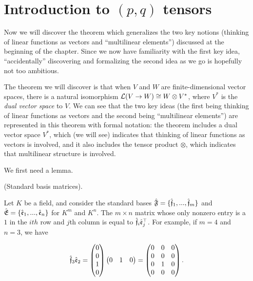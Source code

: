 \newpage

\section{Introduction to $(p, q)$ tensors}
\label{ch::motivated_intro::sec::motivated_intro}

Now we will discover the theorem which generalizes the two key notions (thinking of linear functions as vectors and ``multilinear elements'') discussed at the beginning of the chapter. Since we now have familiarity with the first key idea, ``accidentally'' discovering and formalizing the second idea as we go is hopefully not too ambitious.

The theorem we will discover is that when $V$ and $W$ are finite-dimensional vector spaces, there is a natural isomorphism $\mathcal{L}(V \rightarrow W) \cong W \otimes V^*$, where $V^*$ is the \textit{dual vector space} to $V$. We can see that the two key ideas (the first being thinking of linear functions as vectors and the second being ``multilinear elements'') are represented in this theorem with formal notation: the theorem includes a dual vector space $V^*$, which (we will see) indicates that thinking of linear functions as vectors is involved, and it also includes the tensor product $\otimes$, which indicates that multilinear structure is involved.

We first need a lemma.

\begin{lemma}
    (Standard basis matrices).

    Let $K$ be a field, and consider the standard bases ${\hat{\mathfrak{F}}} = \{ \hat{\mathfrak{f}}_1, ..., \hat{\mathfrak{f}}_m\}$ and ${\hat{\mathfrak{E}}} = \{\hat{\mathfrak{e}}_1, ..., \hat{\mathfrak{e}}_n\}$ for $K^m$ and $K^n$. The $m \times n$ matrix whose only nonzero entry is a $1$ in the $ith$ row and $j$th column is equal to $\hat{\mathfrak{f}}_i \hat{\mathfrak{e}}_j^\top$. For example, if $m = 4$ and $n = 3$, we have

    \begin{align*}
        \hat{\mathfrak{f}}_3 \hat{\mathfrak{e}}_2 = 
        \begin{pmatrix}
            0 \\
            0 \\
            1 \\
            0
        \end{pmatrix}
        \begin{pmatrix}
            0 & 1 & 0
        \end{pmatrix}
        =
        \begin{pmatrix}
            0 & 0 & 0 \\
            0 & 0 & 0 \\
            0 & 1 & 0 \\
            0 & 0 & 0
        \end{pmatrix}.
    \end{align*}
\end{lemma}

